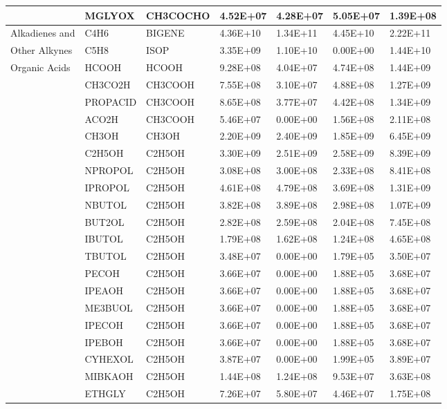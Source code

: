 \begin{longtable}{lllllll}
	 & MGLYOX & CH3COCHO & 4.52E+07 & 4.28E+07 & 5.05E+07 & 1.39E+08 \\
	\hline Alkadienes and & C4H6 & BIGENE & 4.36E+10 & 1.34E+11 & 4.45E+10 & 2.22E+11 \\
	Other Alkynes & C5H8 & ISOP & 3.35E+09 & 1.10E+10 & 0.00E+00 & 1.44E+10 \\
	\hline \multirow{4}{*}{Organic Acids} & HCOOH & HCOOH & 9.28E+08 & 4.04E+07 & 4.74E+08 & 1.44E+09 \\*
	 & CH3CO2H & CH3COOH & 7.55E+08 & 3.10E+07 & 4.88E+08 & 1.27E+09 \\*
	 & PROPACID & CH3COOH & 8.65E+08 & 3.77E+07 & 4.42E+08 & 1.34E+09 \\
	 & ACO2H & CH3COOH & 5.46E+07 & 0.00E+00 & 1.56E+08 & 2.11E+08 \\
	\hline \parbox[t]{2mm}{} & CH3OH & CH3OH & 2.20E+09 & 2.40E+09 & 1.85E+09 & 6.45E+09 \\
	 & C2H5OH & C2H5OH & 3.30E+09 & 2.51E+09 & 2.58E+09 & 8.39E+09 \\
	 & NPROPOL & C2H5OH & 3.08E+08 & 3.00E+08 & 2.33E+08 & 8.41E+08 \\
	 & IPROPOL & C2H5OH & 4.61E+08 & 4.79E+08 & 3.69E+08 & 1.31E+09 \\
	 & NBUTOL & C2H5OH & 3.82E+08 & 3.89E+08 & 2.98E+08 & 1.07E+09 \\
	 & BUT2OL & C2H5OH & 2.82E+08 & 2.59E+08 & 2.04E+08 & 7.45E+08 \\
	 & IBUTOL & C2H5OH & 1.79E+08 & 1.62E+08 & 1.24E+08 & 4.65E+08 \\
	 & TBUTOL & C2H5OH & 3.48E+07 & 0.00E+00 & 1.79E+05 & 3.50E+07 \\
	 & PECOH & C2H5OH & 3.66E+07 & 0.00E+00 & 1.88E+05 & 3.68E+07 \\
	 & IPEAOH & C2H5OH & 3.66E+07 & 0.00E+00 & 1.88E+05 & 3.68E+07 \\
	 & ME3BUOL & C2H5OH & 3.66E+07 & 0.00E+00 & 1.88E+05 & 3.68E+07 \\
	 & IPECOH & C2H5OH & 3.66E+07 & 0.00E+00 & 1.88E+05 & 3.68E+07 \\
	 & IPEBOH & C2H5OH & 3.66E+07 & 0.00E+00 & 1.88E+05 & 3.68E+07 \\
	 & CYHEXOL & C2H5OH & 3.87E+07 & 0.00E+00 & 1.99E+05 & 3.89E+07 \\
	 & MIBKAOH & C2H5OH & 1.44E+08 & 1.24E+08 & 9.53E+07 & 3.63E+08 \\
	 & ETHGLY & C2H5OH & 7.26E+07 & 5.80E+07 & 4.46E+07 & 1.75E+08 \\

\end{longtable}
